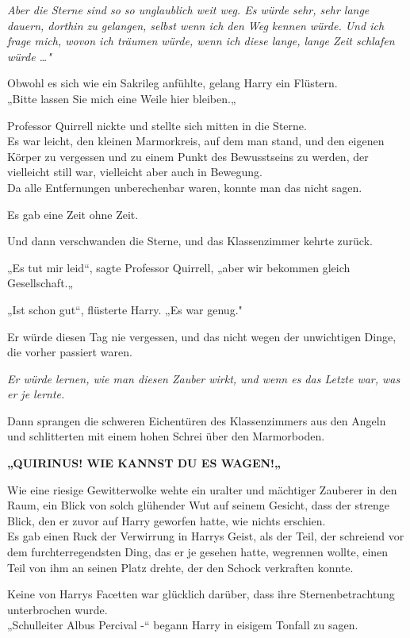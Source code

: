 {\emph{Aber die Sterne sind so so unglaublich weit weg. Es würde sehr, sehr lange dauern, dorthin zu gelangen, selbst wenn ich den Weg kennen würde. Und ich frage mich, wovon ich träumen würde, wenn ich diese lange, lange Zeit schlafen würde …"}

Obwohl es sich wie ein Sakrileg anfühlte, gelang Harry ein Flüstern.\\ „Bitte lassen Sie mich eine Weile hier bleiben.„

Professor Quirrell nickte und stellte sich mitten in die Sterne.\\ Es war leicht, den kleinen Marmorkreis, auf dem man stand, und den eigenen Körper zu vergessen und zu einem Punkt des Bewusstseins zu werden, der vielleicht still war, vielleicht aber auch in Bewegung.\\ Da alle Entfernungen unberechenbar waren, konnte man das nicht sagen.

Es gab eine Zeit ohne Zeit.

Und dann verschwanden die Sterne, und das Klassenzimmer kehrte zurück.

„Es tut mir leid“, sagte Professor Quirrell, „aber wir bekommen gleich Gesellschaft.„

„Ist schon gut“, flüsterte Harry. „Es war genug."

Er würde diesen Tag nie vergessen, und das nicht wegen der unwichtigen Dinge, die vorher passiert waren.

\emph{Er würde lernen, wie man diesen Zauber wirkt, und wenn es das Letzte war, was er je lernte.}

Dann sprangen die schweren Eichentüren des Klassenzimmers aus den Angeln und schlitterten mit einem hohen Schrei über den Marmorboden.

\textbf{„QUIRINUS! WIE KANNST DU ES WAGEN!„}

Wie eine riesige Gewitterwolke wehte ein uralter und mächtiger Zauberer in den Raum, ein Blick von solch glühender Wut auf seinem Gesicht, dass der strenge Blick, den er zuvor auf Harry geworfen hatte, wie nichts erschien.\\ Es gab einen Ruck der Verwirrung in Harrys Geist, als der Teil, der schreiend vor dem furchterregendsten Ding, das er je gesehen hatte, wegrennen wollte, einen Teil von ihm an seinen Platz drehte, der den Schock verkraften konnte.

Keine von Harrys Facetten war glücklich darüber, dass ihre Sternenbetrachtung unterbrochen wurde.\\ „Schulleiter Albus Percival -“ begann Harry in eisigem Tonfall zu sagen.

}
